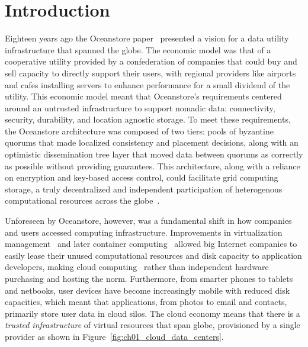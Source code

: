 
\renewcommand{\thechapter}{1}

\chapter{Introduction}
\label{ch:introduction}

Eighteen years ago the Oceanstore paper~\cite{oceanstore} presented a vision for a data utility infrastructure that spanned the globe.
The economic model was that of a cooperative utility provided by a confederation of companies that could buy and sell capacity to directly support their users, with regional providers like airports and cafes installing servers to enhance performance for a small dividend of the utility.
This economic model meant that Oceanstore's requirements centered around an untrusted infrastructure to support nomadic data: connectivity, security, durability, and location agnostic storage.
To meet these requirements, the Oceanstore architecture was composed of two tiers: pools of byzantine quorums that made localized consistency and placement decisions, along with an optimistic dissemination tree layer that moved data between quorums as correctly as possible without providing guarantees.
This architecture, along with a reliance on encryption and key-based access control, could facilitate grid computing storage, a truly decentralized and independent participation of heterogenous computational resources across the globe~\cite{grid_computing}.

Unforeseen by Oceanstore, however, was a fundamental shift in how companies and users accessed computing infrastructure.
Improvements in virtualization management~\cite{eucalyptus} and later container computing~\cite{docker} allowed big Internet companies to easily lease their unused computational resources and disk capacity to application developers, making cloud computing~\cite{cloud_computing} rather than independent hardware purchasing and hosting the norm.
Furthermore, from smarter phones to tablets and netbooks, user devices have become increasingly mobile with reduced disk capacities, which meant that applications, from photos to email and contacts, primarily store user data in cloud silos.
The cloud economy means that there is a \emph{trusted infrastructure} of virtual resources that span globe, provisioned by a single provider as shown in Figure~\ref{fig:ch01_cloud_data_centers}.

